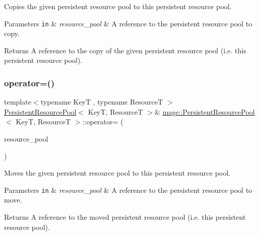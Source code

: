 Copies the given persistent resource pool to this persistent resource pool.


\begin{DoxyParams}[1]{Parameters}
\mbox{\tt in}  & {\em resource\+\_\+pool} & A reference to the persistent resource pool to copy. \\
\hline
\end{DoxyParams}
\begin{DoxyReturn}{Returns}
A reference to the copy of the given persistent resource pool (i.\+e. this persistent resource pool). 
\end{DoxyReturn}
\hypertarget{classmage_1_1_persistent_resource_pool_a7c83ee99233b8fc91d005c6edf6d729e}{}\label{classmage_1_1_persistent_resource_pool_a7c83ee99233b8fc91d005c6edf6d729e} 
\subsubsection{\texorpdfstring{operator=()}{operator=()}\hspace{0.1cm}{\footnotesize\ttfamily [2/2]}}
{\footnotesize\ttfamily template$<$typename KeyT , typename ResourceT $>$ \\
\hyperlink{classmage_1_1_persistent_resource_pool}{Persistent\+Resource\+Pool}$<$ KeyT, ResourceT $>$\& \hyperlink{classmage_1_1_persistent_resource_pool}{mage\+::\+Persistent\+Resource\+Pool}$<$ KeyT, ResourceT $>$\+::operator= (\begin{DoxyParamCaption}\item[{\hyperlink{classmage_1_1_persistent_resource_pool}{Persistent\+Resource\+Pool}$<$ KeyT, ResourceT $>$ \&\&}]{resource\+\_\+pool }\end{DoxyParamCaption})\hspace{0.3cm}{\ttfamily [delete]}}

Moves the given persistent resource pool to this persistent resource pool.


\begin{DoxyParams}[1]{Parameters}
\mbox{\tt in}  & {\em resource\+\_\+pool} & A reference to the persistent resource pool to move. \\
\hline
\end{DoxyParams}
\begin{DoxyReturn}{Returns}
A reference to the moved persistent resource pool (i.\+e. this persistent resource pool). 
\end{DoxyReturn}
\hypertarget{classmage_1_1_persistent_resource_pool_ae8b7a0b7d2f6adefc725d08367b8a29f}{}\label{classmage_1_1_persistent_resource_pool_ae8b7a0b7d2f6adefc725d08367b8a29f} 
